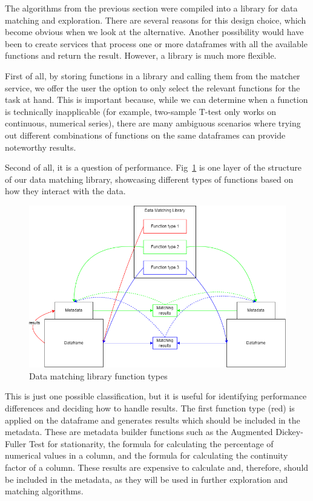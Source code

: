 The algorithms from the previous section were compiled into a library for data matching and exploration.
There are several reasons for this design choice, which become obvious when we look at the alternative.
Another possibility would have been to create services that process one or more dataframes with all the available functions
and return the result.
However, a library is much more flexible.

First of all, by storing functions in a library and calling them from the matcher service, we offer the user the option to
only select the relevant functions for the task at hand.
This is important because, while we can determine when a function is technically inapplicable (for example, two-sample T-test
only works on continuous, numerical series), there are many ambiguous scenarios where trying out different combinations of
functions on the same dataframes can provide noteworthy results.

Second of all, it is a question of performance.
Fig~\ref{fig:data_matching_library_function_types} is one layer of the structure of our data matching library, showcasing
different types of functions based on how they interact with the data.

\begin{figure}[H]
    \centering
    \includegraphics[width=12cm]{figures/data_matching_library/data_matching_library}
    \caption{Data matching library function types}
    \label{fig:data_matching_library_function_types}
\end{figure}

This is just one possible classification, but it is useful for identifying performance differences and deciding how to
handle results.
The first function type (red) is applied on the dataframe and generates results which should be included in the metadata.
These are metadata builder functions such as the Augmented Dickey-Fuller Test for stationarity, the formula for calculating
the percentage of numerical values in a column, and the formula for calculating the continuity factor of a column.
These results are expensive to calculate and, therefore, should be included in the metadata, as they will be used in further
exploration and matching algorithms.

